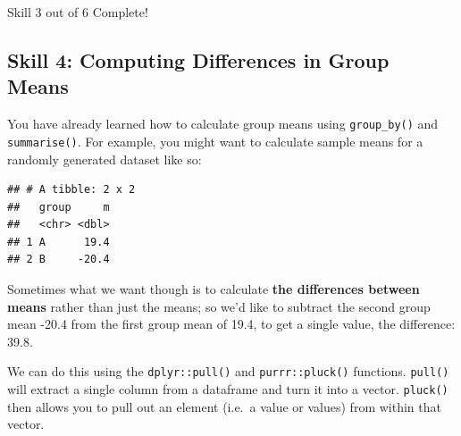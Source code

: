 \documentclass[]{book}
\newenvironment{Shaded}{\begin{snugshade}}{\end{snugshade}}
\newcommand{\DataTypeTok}[1]{\textcolor[rgb]{0.13,0.29,0.53}{#1}}
\newcommand{\DecValTok}[1]{\textcolor[rgb]{0.00,0.00,0.81}{#1}}
\newcommand{\KeywordTok}[1]{\textcolor[rgb]{0.13,0.29,0.53}{\textbf{#1}}}
\newcommand{\NormalTok}[1]{#1}
\newcommand{\OperatorTok}[1]{\textcolor[rgb]{0.81,0.36,0.00}{\textbf{#1}}}
\newcommand{\StringTok}[1]{\textcolor[rgb]{0.31,0.60,0.02}{#1}}
\begin{document}
{Skill 3 out of 6 Complete!}

\hypertarget{skill-4-computing-differences-in-group-means}{%
\subsection{Skill 4: Computing Differences in Group Means}\label{skill-4-computing-differences-in-group-means}}

You have already learned how to calculate group means using \texttt{group\_by()} and \texttt{summarise()}. For example, you might want to calculate sample means for a randomly generated dataset like so:

\begin{Shaded}
\end{Shaded}

\begin{verbatim}
## # A tibble: 2 x 2
##   group     m
##   <chr> <dbl>
## 1 A      19.4
## 2 B     -20.4
\end{verbatim}

Sometimes what we want though is to calculate \textbf{the differences between means} rather than just the means; so we'd like to subtract the second group mean -20.4 from the first group mean of 19.4, to get a single value, the difference: 39.8.

We can do this using the \texttt{dplyr::pull()} and \texttt{purrr::pluck()} functions. \texttt{pull()} will extract a single column from a dataframe and turn it into a vector. \texttt{pluck()} then allows you to pull out an element (i.e.~a value or values) from within that vector.
\end{document}
